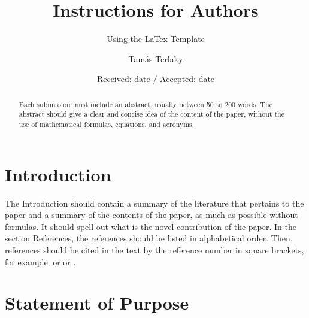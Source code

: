 \documentclass[smallextended,referee,envcountsect,]{svjour3}
\begin{document}
\title{Instructions for Authors}

\subtitle{Using  the  LaTex Template}

\author{Tam\'as Terlaky}


\date{Received: date / Accepted: date}

\maketitle

\begin{abstract}
Each submission must include an abstract, usually between 50 to 200 words. The abstract should give a clear and concise idea of the  content of the paper,  without the use of mathematical formulas, equations, and acronyms.
\end{abstract}


\section{Introduction}

The Introduction should contain a summary of the literature that pertains to the paper and a summary of the contents of the paper, as much as possible without formulas. It should spell out what is the novel contribution of the paper.  In the section References, the references should be listed in alphabetical order. Then, references should be cited in the text by the reference number in square brackets, for example, \cite{Huang} or \cite{Huang,Miele} or 
\cite{Huang,Miele,Nocedal,Ralston,Yang}.

\section{Statement of Purpose}
\end{document}
